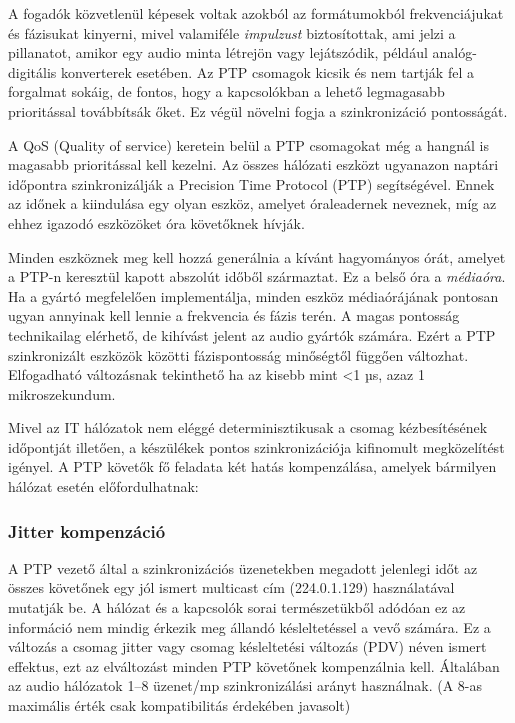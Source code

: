 A fogadók közvetlenül képesek voltak azokból az formátumokból frekvenciájukat és fázisukat kinyerni,
mivel valamiféle \textit{impulzust} biztosítottak, ami jelzi a pillanatot, amikor egy
audio minta létrejön vagy lejátszódik, például analóg-digitális konverterek esetében.
Az PTP csomagok kicsik és nem tartják fel a forgalmat sokáig, de fontos, hogy a
kapcsolókban a lehető legmagasabb prioritással továbbítsák őket. 
Ez végül növelni fogja a szinkronizáció pontosságát. 

A QoS (Quality of service) keretein belül a PTP csomagokat még a hangnál is magasabb prioritással kell
kezelni. Az összes hálózati eszközt ugyanazon naptári időpontra szinkronizálják a Precision Time Protocol
(PTP) segítségével. Ennek az időnek a kiindulása egy olyan eszköz, amelyet óraleadernek
neveznek, míg az ehhez igazodó eszközöket óra követőknek hívják. 

Minden eszköznek meg kell hozzá generálnia a kívánt hagyományos órát, amelyet a PTP-n keresztül kapott
abszolút időből származtat. Ez a belső óra a \textit{médiaóra}. 
Ha a gyártó megfelelően implementálja, minden eszköz médiaórájának pontosan ugyan annyinak kell lennie a
frekvencia és fázis terén. A magas pontosság technikailag elérhető, de kihívást
jelent az audio gyártók számára. Ezért a PTP szinkronizált eszközök közötti
fázispontosság minőségtől függően változhat. Elfogadható változásnak tekinthető ha az kisebb mint <1 µs, azaz 1 mikroszekundum.

Mivel az IT hálózatok nem eléggé determinisztikusak a csomag kézbesítésének időpontját
illetően, a készülékek pontos szinkronizációja kifinomult megközelítést igényel.
A PTP követők fő feladata két hatás kompenzálása, amelyek bármilyen hálózat esetén előfordulhatnak:
\subsubsection{Jitter kompenzáció}
A PTP vezető által a szinkronizációs üzenetekben megadott jelenlegi időt az összes követőnek egy jól ismert multicast
cím (224.0.1.129) használatával mutatják be. 
A hálózat és a kapcsolók sorai természetükből adódóan ez az információ nem mindig érkezik meg állandó
késleltetéssel a vevő számára. 
Ez a változás a csomag jitter vagy csomag késleltetési változás (PDV) néven ismert effektus,
ezt az elváltozást minden PTP követőnek kompenzálnia kell. 
Általában az audio hálózatok 1--8 üzenet/mp szinkronizálási arányt
használnak. (A 8-as maximális érték csak kompatibilitás érdekében javasolt)
